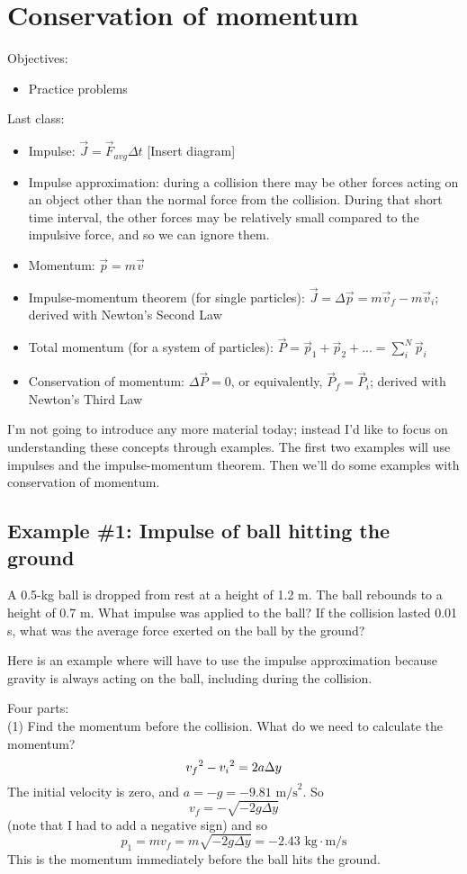 \section{Conservation of momentum}
Objectives:
\begin{itemize}
\item Practice problems
\end{itemize}

Last class:
\begin{itemize}
\item Impulse: $\vec{J}=\vec{F}_{avg}\Delta{t}$ [Insert diagram]
\item Impulse approximation: during a collision there may be other forces acting on an object other than the normal force from the collision. During that short time interval, the other forces may be relatively small compared to the impulsive force, and so we can ignore them. 
\item Momentum: $\vec{p}=m\vec{v}$
\item Impulse-momentum theorem (for single particles): $\vec{J}=\Delta{\vec{p}}=m\vec{v}_f-m\vec{v}_i$; derived with Newton's Second Law
\item Total momentum (for a system of particles): $\vec{P}=\vec{p}_1+\vec{p}_2+...=\sum_i^N \vec{p}_i$
\item Conservation of momentum: $\Delta{\vec{P}}=0$, or equivalently, $\vec{P}_f=\vec{P}_i$; derived with Newton's Third Law
\end{itemize}

I'm not going to introduce any more material today; instead I'd like to focus on understanding these concepts through examples. The first two examples will use impulses and the impulse-momentum theorem. Then we'll do some examples with conservation of momentum.

\subsection{Example \#1: Impulse of ball hitting the ground}
A 0.5-kg ball is dropped from rest at a height of 1.2 m. The ball rebounds to a height of 0.7 m. What impulse was applied to the ball? If the collision lasted 0.01 s, what was the average force exerted on the ball by the ground?

Here is an example where will have to use the impulse approximation because gravity is always acting on the ball, including during the collision.

Four parts:\\
(1) Find the momentum before the collision. What do we need to calculate the momentum?
$$v_f\displaystyle^2-v_i\displaystyle^2=2a\Delta{y}$$
The initial velocity is zero, and $a=-g=-9.81\mbox{ m/s}^2$. So
$$v_f=-\sqrt{-2g\Delta{y}}$$
(note that I had to add a negative sign) and so 
$$p_1=mv_f=m\sqrt{-2g\Delta{y}}=-2.43\mbox{ kg}\cdot\mbox{m/s}$$
This is the momentum immediately before the ball hits the ground.

